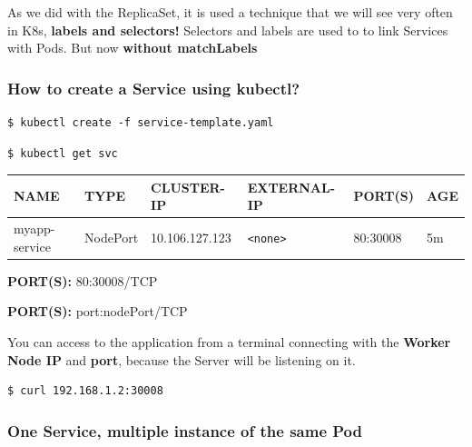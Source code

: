 \documentclass{article}
\newenvironment{codetemplate}[1][]{%
  \mybasecolorbox[#1]
  \itshape
}{%
  \endmybasecolorbox
}
\begin{document}
As we did with the ReplicaSet, it is used a technique that we will see very often in K8s, \textbf{labels and selectors!} Selectors and labels are used to to link Services with Pods. But now \textbf{without matchLabels}

\subsubsection{How to create a Service using kubectl?}
\begin{codetemplate}{}
\begin{verbatim}
$ kubectl create -f service-template.yaml
\end{verbatim}
\end{codetemplate}

\begin{codetemplate}{}
\begin{verbatim}
$ kubectl get svc
\end{verbatim}
\end{codetemplate}

\begin{table}[H]
\begin{tabular}{| m{3cm} | m{2cm} | m{2.5cm} | m{2.7cm} | m{2cm} | m{1.2cm} |}
\hline
\textbf{NAME} & \textbf{TYPE} & \textbf{CLUSTER-IP} & \textbf{EXTERNAL-IP} & \textbf{PORT(S)} & \textbf{AGE} \\ \hline
myapp-service & NodePort & 10.106.127.123 & \verb|<none>| & 80:30008 & 5m \\ \hline
\end{tabular}
\end{table}

\textbf{PORT(S):} 80:30008/TCP

\textbf{PORT(S):} port:nodePort/TCP

You can access to the application from a terminal connecting with the \textbf{Worker Node IP} and \textbf{port}, because the Server will be listening on it.

\begin{codetemplate}{}
\begin{verbatim}
$ curl 192.168.1.2:30008
\end{verbatim}
\end{codetemplate}

\subsubsection{One Service, multiple instance of the same Pod}
\end{document}
